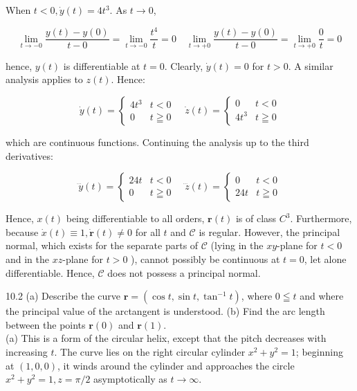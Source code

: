 \documentclass[10pt]{article}
\begin{document}
When $t<0, \dot{y}(t)=4 t^{3}$. As $t \rightarrow 0$,

$$
\lim _{t \rightarrow-0} \frac{y(t)-y(0)}{t-0}=\lim _{t \rightarrow-0} \frac{t^{4}}{t}=0 \quad \lim _{t \rightarrow+0} \frac{y(t)-y(0)}{t-0}=\lim _{t \rightarrow+0} \frac{0}{t}=0
$$

hence, $y(t)$ is differentiable at $t=0$. Clearly, $\dot{y}(t)=0$ for $t>0$. A similar analysis applies to $z(t)$. Hence:

$$
\dot{y}(t)=\left\{\begin{array}{ll}
4 t^{3} & t<0 \\
0 & t \geqq 0
\end{array} \quad \dot{z}(t)= \begin{cases}0 & t<0 \\
4 t^{3} & t \geqq 0\end{cases}\right.
$$

which are continuous functions. Continuing the analysis up to the third derivatives:

$$
\dddot{y}(t)=\left\{\begin{array}{ll}
24 t & t<0 \\
0 & t \geqq 0
\end{array} \quad \dddot{z}(t)= \begin{cases}0 & t<0 \\
24 t & t \geqq 0\end{cases}\right.
$$

Hence, $x(t)$ being differentiable to all orders, $\mathbf{r}(t)$ is of class $C^{3}$. Furthermore, because $\dot{x}(t) \equiv 1, \dot{\mathbf{r}}(t) \neq 0$ for all $t$ and $\mathscr{C}$ is regular. However, the principal normal, which exists for the separate parts of $\mathscr{C}$ (lying in the $x y$-plane for $t<0$ and in the $x z$-plane for $t>0$ ), cannot possibly be continuous at $t=0$, let alone differentiable. Hence, $\mathscr{C}$ does not possess a principal normal.

10.2 (a) Describe the curve $\mathbf{r}=\left(\cos t, \sin t, \tan ^{-1} t\right)$, where $0 \leqq t$ and where the principal value of the arctangent is understood. (b) Find the arc length between the points $\mathbf{r}(0)$ and $\mathbf{r}(1)$.\\
(a) This is a form of the circular helix, except that the pitch decreases with increasing $t$. The curve lies on the right circular cylinder $x^{2}+y^{2}=1$; beginning at $(1,0,0)$, it winds around the cylinder and approaches the circle $x^{2}+y^{2}=1, z=\pi / 2$ asymptotically as $t \rightarrow \infty$.
\end{document}
